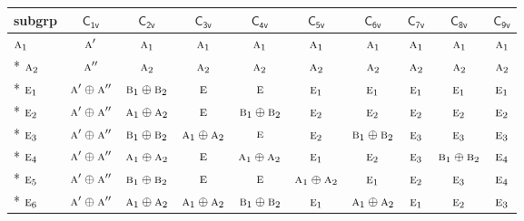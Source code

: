 \documentclass[10pt,a4paper]{article}
\numberwithin{equation}{section}
\newcommand{\grp}[1]{\mathsf{#1}}
\newcommand{\irr}[1]{\text{\normalfont\scshape #1}}
\begin{document}
{\small\begin{longtable}{@{}lccccccccc@{}}\toprule
subgrp & \href{C1v.pdf}{$\grp{C_{1v}}$} & \href{C2v.pdf}{$\grp{C_{2v}}$} & \href{C3v.pdf}{$\grp{C_{3v}}$} & \href{C4v.pdf}{$\grp{C_{4v}}$} & \href{C5v.pdf}{$\grp{C_{5v}}$} & \href{C6v.pdf}{$\grp{C_{6v}}$} & \href{C7v.pdf}{$\grp{C_{7v}}$} & \href{C8v.pdf}{$\grp{C_{8v}}$} & \href{C9v.pdf}{$\grp{C_{9v}}$}\\\midrule\endhead
\bottomrule\endfoot\endlastfoot
$\irr{a}_{1}$ & $\irr{a}'$ & $\irr{a}_{1}$ & $\irr{a}_{1}$ & $\irr{a}_{1}$ & $\irr{a}_{1}$ & $\irr{a}_{1}$ & $\irr{a}_{1}$ & $\irr{a}_{1}$ & $\irr{a}_{1}$\\*
$\irr{a}_{2}$ & $\irr{a}''$ & $\irr{a}_{2}$ & $\irr{a}_{2}$ & $\irr{a}_{2}$ & $\irr{a}_{2}$ & $\irr{a}_{2}$ & $\irr{a}_{2}$ & $\irr{a}_{2}$ & $\irr{a}_{2}$\\*
$\irr{e}_{1}$ & $\irr{a}'\oplus \irr{a}''$ & $\irr{b}_{1}\oplus \irr{b}_{2}$ & $\irr{e}$ & $\irr{e}$ & $\irr{e}_{1}$ & $\irr{e}_{1}$ & $\irr{e}_{1}$ & $\irr{e}_{1}$ & $\irr{e}_{1}$\\*
$\irr{e}_{2}$ & $\irr{a}'\oplus \irr{a}''$ & $\irr{a}_{1}\oplus \irr{a}_{2}$ & $\irr{e}$ & $\irr{b}_{1}\oplus \irr{b}_{2}$ & $\irr{e}_{2}$ & $\irr{e}_{2}$ & $\irr{e}_{2}$ & $\irr{e}_{2}$ & $\irr{e}_{2}$\\*
$\irr{e}_{3}$ & $\irr{a}'\oplus \irr{a}''$ & $\irr{b}_{1}\oplus \irr{b}_{2}$ & $\irr{a}_{1}\oplus \irr{a}_{2}$ & $\irr{e}$ & $\irr{e}_{2}$ & $\irr{b}_{1}\oplus \irr{b}_{2}$ & $\irr{e}_{3}$ & $\irr{e}_{3}$ & $\irr{e}_{3}$\\*
$\irr{e}_{4}$ & $\irr{a}'\oplus \irr{a}''$ & $\irr{a}_{1}\oplus \irr{a}_{2}$ & $\irr{e}$ & $\irr{a}_{1}\oplus \irr{a}_{2}$ & $\irr{e}_{1}$ & $\irr{e}_{2}$ & $\irr{e}_{3}$ & $\irr{b}_{1}\oplus \irr{b}_{2}$ & $\irr{e}_{4}$\\*
$\irr{e}_{5}$ & $\irr{a}'\oplus \irr{a}''$ & $\irr{b}_{1}\oplus \irr{b}_{2}$ & $\irr{e}$ & $\irr{e}$ & $\irr{a}_{1}\oplus \irr{a}_{2}$ & $\irr{e}_{1}$ & $\irr{e}_{2}$ & $\irr{e}_{3}$ & $\irr{e}_{4}$\\*
$\irr{e}_{6}$ & $\irr{a}'\oplus \irr{a}''$ & $\irr{a}_{1}\oplus \irr{a}_{2}$ & $\irr{a}_{1}\oplus \irr{a}_{2}$ & $\irr{b}_{1}\oplus \irr{b}_{2}$ & $\irr{e}_{1}$ & $\irr{a}_{1}\oplus \irr{a}_{2}$ & $\irr{e}_{1}$ & $\irr{e}_{2}$ & $\irr{e}_{3}$\\
\bottomrule\end{longtable}}
\end{document}
